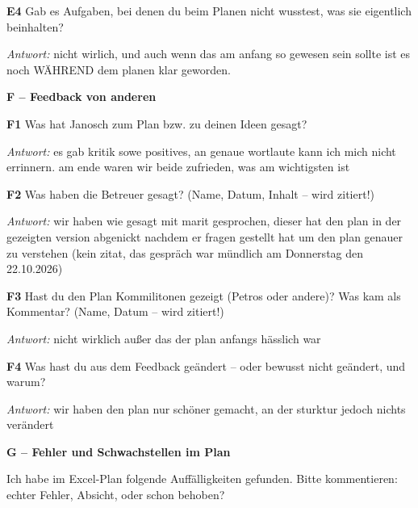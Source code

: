 {\par\noindent \textbf{E4} Gab es Aufgaben, bei denen du beim Planen nicht wusstest, was sie eigentlich beinhalten?\par
\par\noindent\emph{Antwort:} nicht wirlich, und auch wenn das am anfang so gewesen sein sollte ist es noch WÄHREND dem planen klar geworden.\par\smallskip
\par\medskip\noindent\textbf{F – Feedback von anderen}\par
\par\noindent \textbf{F1} Was hat Janosch zum Plan bzw. zu deinen Ideen gesagt?\par
\par\noindent\emph{Antwort:} es gab kritik sowe positives, an genaue wortlaute kann ich mich nicht errinnern. am ende waren wir beide zufrieden, was am wichtigsten ist\par\smallskip
\par\noindent \textbf{F2} Was haben die Betreuer gesagt? (Name, Datum, Inhalt – wird zitiert!)\par
\par\noindent\emph{Antwort:} wir haben wie gesagt mit marit gesprochen, dieser hat den plan in der gezeigten version abgenickt nachdem er fragen gestellt hat um den plan genauer zu verstehen (kein zitat, das gespräch war mündlich am Donnerstag den 22.10.2026)\par\smallskip
\par\noindent \textbf{F3} Hast du den Plan Kommilitonen gezeigt (Petros oder andere)? Was kam als Kommentar? (Name, Datum – wird zitiert!)\par
\par\noindent\emph{Antwort:} nicht wirklich außer das der plan anfangs hässlich war\par\smallskip
\par\noindent \textbf{F4} Was hast du aus dem Feedback geändert – oder bewusst nicht geändert, und warum?\par
\par\noindent\emph{Antwort:} wir haben den plan nur schöner gemacht, an der sturktur jedoch nichts verändert\par\smallskip
\par\medskip\noindent\textbf{G – Fehler und Schwachstellen im Plan}\par
\par\noindent Ich habe im Excel-Plan folgende Auffälligkeiten gefunden. Bitte kommentieren: echter Fehler, Absicht, oder schon behoben?\par
}
